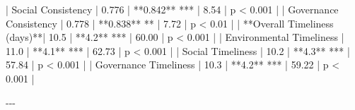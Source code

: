 \documentclass[
  12pt,
]{article}
\newenvironment{Shaded}{\begin{snugshade}}{\end{snugshade}}
\newcommand{\NormalTok}[1]{\textcolor[rgb]{0.00,0.23,0.31}{#1}}
\newcommand{\PreprocessorTok}[1]{\textcolor[rgb]{0.68,0.00,0.00}{#1}}
\begin{document}
\begin{Shaded}
\begin{Highlighting}[]
\PreprocessorTok{|}\NormalTok{ Social Consistency          }\PreprocessorTok{|}\NormalTok{ 0.776             }\PreprocessorTok{|}\NormalTok{ **0.842** ***         }\PreprocessorTok{|}\NormalTok{ 8.54                   }\PreprocessorTok{|}\NormalTok{ p \textless{} 0.001                      }\PreprocessorTok{|}
\PreprocessorTok{|}\NormalTok{ Governance Consistency      }\PreprocessorTok{|}\NormalTok{ 0.778             }\PreprocessorTok{|}\NormalTok{ **0.838** **          }\PreprocessorTok{|}\NormalTok{ 7.72                   }\PreprocessorTok{|}\NormalTok{ p \textless{} 0.01                       }\PreprocessorTok{|}
\PreprocessorTok{|}\NormalTok{ **Overall Timeliness (days)**| 10.5              | **4.2** ***           }\PreprocessorTok{|}\NormalTok{ 60.00                  }\PreprocessorTok{|}\NormalTok{ p \textless{} 0.001                      }\PreprocessorTok{|}
\PreprocessorTok{|}\NormalTok{ Environmental Timeliness    }\PreprocessorTok{|}\NormalTok{ 11.0              }\PreprocessorTok{|}\NormalTok{ **4.1** ***           }\PreprocessorTok{|}\NormalTok{ 62.73                  }\PreprocessorTok{|}\NormalTok{ p \textless{} 0.001                      }\PreprocessorTok{|}
\PreprocessorTok{|}\NormalTok{ Social Timeliness           }\PreprocessorTok{|}\NormalTok{ 10.2              }\PreprocessorTok{|}\NormalTok{ **4.3** ***           }\PreprocessorTok{|}\NormalTok{ 57.84                  }\PreprocessorTok{|}\NormalTok{ p \textless{} 0.001                      }\PreprocessorTok{|}
\PreprocessorTok{|}\NormalTok{ Governance Timeliness       }\PreprocessorTok{|}\NormalTok{ 10.3              }\PreprocessorTok{|}\NormalTok{ **4.2** ***           }\PreprocessorTok{|}\NormalTok{ 59.22                  }\PreprocessorTok{|}\NormalTok{ p \textless{} 0.001                      }\PreprocessorTok{|}

\NormalTok{{-}{-}{-}}


\end{Highlighting}
\end{Shaded}
\end{document}
